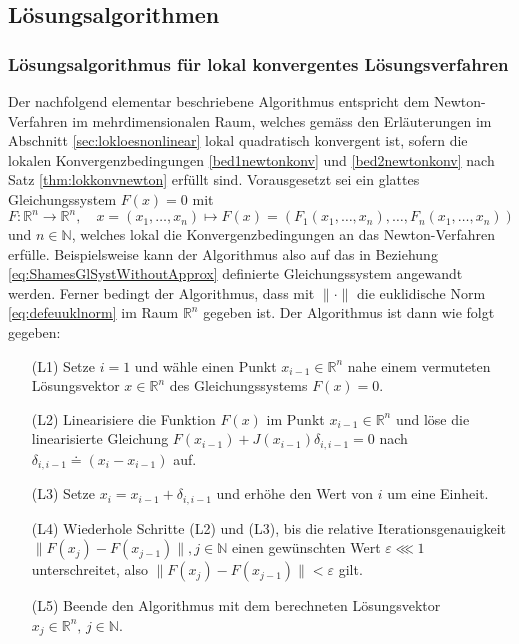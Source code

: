 \documentclass[a4paper,12pt]{article}
\numberwithin{equation}{section}
\begin{document}
\subsection{Lösungsalgorithmen}
\subsubsection{Lösungsalgorithmus für lokal konvergentes Lösungsverfahren}\label{sec:loesalgolocal}
Der nachfolgend elementar beschriebene Algorithmus entspricht dem Newton-Verfahren im mehrdimensionalen Raum, welches gemäss den Erläuterungen im Abschnitt \ref{sec:lokloesnonlinear} lokal quadratisch konvergent ist, sofern die lokalen Konvergenzbedingungen \ref{bed1newtonkonv} und \ref{bed2newtonkonv} nach Satz \ref{thm:lokkonvnewton} erfüllt sind. Vorausgesetzt sei ein glattes Gleichungssystem $F(x) = 0$ mit \begin{equation}
F: \mathbb{R}^n \rightarrow \mathbb{R}^n, \quad x = (x_1,\dots,x_n) \mapsto F(x) = (F_1(x_1,\dots,x_n),\dots,F_n(x_1,\dots,x_n))
\end{equation} und $n \in \mathbb{N}$, welches lokal die Konvergenzbedingungen an das Newton-Verfahren erfülle. Beispielsweise kann der Algorithmus also auf das in Beziehung \eqref{eq:ShamesGlSystWithoutApprox} definierte Gleichungssystem angewandt werden. Ferner bedingt der Algorithmus, dass mit $\|\cdot\|$ die euklidische Norm \eqref{eq:defeuuklnorm} im Raum $\mathbb{R}^n$ gegeben ist. Der Algorithmus ist dann wie folgt gegeben:
\begin{itemize}
\item[(L1)] Setze $i=1$ und wähle einen Punkt $x_{i-1}\in\mathbb{R}^n$ nahe einem vermuteten Lösungsvektor $x \in \mathbb{R}^n$ des Gleichungssystems $F(x) = 0$.
\item[(L2)] Linearisiere die Funktion $F(x)$ im Punkt $x_{i-1}\in\mathbb{R}^n$ und löse die linearisierte Gleichung $F(x_{i-1}) + J(x_{i-1})\delta_{i,i-1} = 0$ nach $\delta_{i,i-1} \doteq (x_i-x_{i-1})$ auf.
\item[(L3)] Setze $x_i = x_{i-1} + \delta_{i,i-1}$ und erhöhe den Wert von $i$ um eine Einheit.
\item[(L4)] Wiederhole Schritte (L2) und (L3), bis die relative Iterationsgenauigkeit $\|F(x_j)-F(x_{j-1})\|, j \in \mathbb{N}$ einen gewünschten Wert $\varepsilon \lll 1$ unterschreitet, also $\|F(x_j)-F(x_{j-1})\| < \varepsilon$ gilt.
\item[(L5)] Beende den Algorithmus mit dem berechneten Lösungsvektor $x_j \in \mathbb{R}^n, \,j \in \mathbb{N}$.
\end{itemize}
\end{document}
